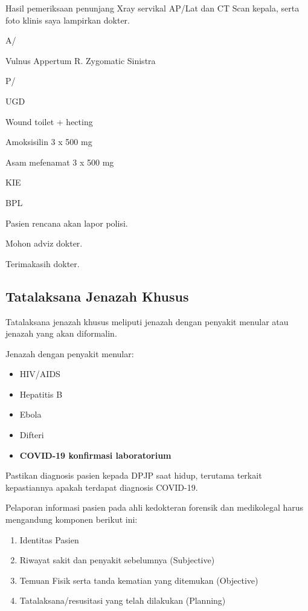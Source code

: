 \documentclass[
]{book}
\begin{document}
Hasil pemeriksaan penunjang Xray servikal AP/Lat dan CT Scan kepala, serta foto klinis saya lampirkan dokter.

A/

Vulnus Appertum R. Zygomatic Sinistra

P/

UGD

Wound toilet + hecting

Amoksisilin 3 x 500 mg

Asam mefenamat 3 x 500 mg

KIE

BPL

Pasien rencana akan lapor polisi.

Mohon adviz dokter.

Terimakasih dokter.

\hypertarget{tatalaksana-jenazah-khusus}{%
\subsection{Tatalaksana Jenazah Khusus}\label{tatalaksana-jenazah-khusus}}

Tatalaksana jenazah khusus meliputi jenazah dengan penyakit menular atau jenazah yang akan diformalin.

Jenazah dengan penyakit menular:

\begin{itemize}
\item
  HIV/AIDS
\item
  Hepatitis B
\item
  Ebola
\item
  Difteri
\item
  \textbf{COVID-19 konfirmasi laboratorium}
\end{itemize}

Pastikan diagnosis pasien kepada DPJP saat hidup, terutama terkait kepastiannya apakah terdapat diagnosis COVID-19.

Pelaporan informasi pasien pada ahli kedokteran forensik dan medikolegal harus mengandung komponen berikut ini:

\begin{enumerate}
\def\labelenumi{\arabic{enumi}.}
\item
  Identitas Pasien
\item
  Riwayat sakit dan penyakit sebelumnya (Subjective)
\item
  Temuan Fisik serta tanda kematian yang ditemukan (Objective)
\item
  Tatalaksana/resusitasi yang telah dilakukan (Planning)
\end{enumerate}
\end{document}
